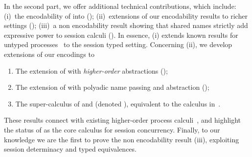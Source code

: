 \documentclass[preprint,11pt]{elsarticle}
\begin{document}
{In the second part, we offer additional technical contributions, which include: 
(i)~the encodability of \HO into \sessp (); 
(ii)~extensions of our encodability results to richer settings ();
(iii)~a non encodability result showing that shared names strictly add expressive power to session calculi ().
In essence, (i) extends known  results for untyped processes~\cite{SangiorgiD:expmpa} to the session typed setting.
Concerning (ii), we develop extensions of our encodings to 
\begin{enumerate}[-]
\item The extension of \HOp with \emph{higher-order} abstractions (\HOpp); 
\item The extension of \HOp with polyadic name passing and abstraction (\PHOp); 
\item The super-calculus of \HOpp and \PHOp (denoted \PHOpp), equivalent to the calculus in~\cite{tlca07}.
\end{enumerate}

These results connect \HOp with existing higher-order process calculi~\cite{tlca07}, and  
 highlight the status of \HO as the core calculus for session concurrency.
Finally, %
to our knowledge we are the first to prove 
the non encodability result (iii),
exploiting session determinacy and typed equivalences.




}
\end{document}
